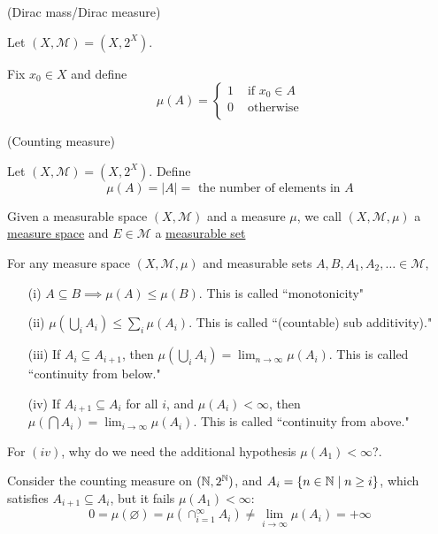 \documentclass[x11names,reqno,14pt]{extarticle}
\begin{document}
\exm (Dirac mass/Dirac measure)

Let $(X, \mathcal{M}) = (X, 2^X)$. 

Fix $x_0 \in X$ and define 
\[
\mu(A) = \begin{cases} 1& \text{ if }x_0 \in A \\ 0 & \text{ otherwise} \\ \end{cases}
\]

\exm (Counting measure)

Let $(X, \mathcal{M}) = (X, 2^X)$. Define
\[
\mu(A) = |A| = \text{ the number of elements in }A
\]

Given a measurable space $(X, \mathcal{M})$ and a measure $\mu$, we call $(X, \mathcal{M}, \mu)$ a \underline{measure space} and $E \in \mathcal{M}$ a \underline{measurable set} 

\thm For any measure space $(X, \mathcal{M}, \mu)$ and measurable sets $A, B, A_1, A_2, \dots \in \mathcal{M}$, 

\begin{enumerate}
\item[(i)] $A \subseteq B \implies \mu(A)\leq\mu(B)$. This is called ``monotonicity"
\item[(ii)] $\mu(\bigcup_i A_i) \leq \sum_i\mu(A_i)$. This is called ``(countable) sub additivity)."
\item[(iii)] If $A_i\subseteq A_{i + 1}$, then $\mu(\bigcup_i A_i) = \lim_{n\to\infty}\mu(A_i)$. This is called ``continuity from below." 
\item[(iv)] If $A_{i + 1} \subseteq A_i$ for all $i$, and $\mu(A_i) < \infty$, then $\mu(\bigcap A_i) = \lim_{i\to\infty}\mu(A_i)$. This is called ``continuity from above."
\end{enumerate}

\rem For $(iv)$, why do we need the additional hypothesis $\mu(A_1) < \infty$?. 

Consider the counting measure on $(\mathbb{N}, 2^{\mathbb{N}})$, and $A_i = \{n \in \mathbb{N} \mid n \geq i\}$, which satisfies $A_{i + 1} \subseteq A_i$, but it fails $\mu(A_1) < \infty$:
\[
0 = \mu(\varnothing) = \mu(\cap_{i=1}^\infty A_i) \neq \lim_{i\to\infty}\mu(A_i) = + \infty
\]
\end{document}

